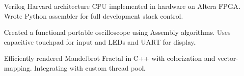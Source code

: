 \documentclass{cv}  %
\begin{document}
\begin{paracol}{2}



\parbox[t]{0.25 \textwidth}{\large{}}
\hfill
\parbox[t]{0.5 \linewidth}{\vspace{-11pt} Verilog Harvard architecture CPU implemented in hardware on Altera FPGA. Wrote Python assembler for full development stack control.}
\hspace{0pt}
\vspace{0pt}

\divider

\parbox[t]{0.25 \textwidth}{\Large{}}
\hfill
\parbox[t]{0.5 \linewidth}{\vspace{-11pt} Created a functional portable oscilloscope using Assembly algorithms. Uses capacitive touchpad for input and LEDs and UART for display.}
\hspace{0pt}
\vspace{-12pt}

\divider

\parbox[t]{0.25 \textwidth}{\Large{}}
\hfill
\parbox[t]{0.5 \linewidth}{\vspace{-11pt} Efficiently rendered Mandelbrot Fractal in C++ with colorization and vector-mapping. Integrating with custom thread pool.}
\hspace{0pt}
\vspace{-12pt}

\end{paracol}
\end{document}
